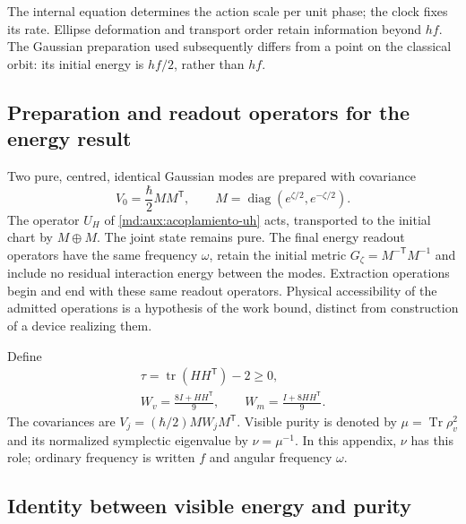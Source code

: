 The internal equation determines the action scale per unit phase;
the clock fixes its rate. Ellipse deformation and transport order
retain information beyond $hf$. The Gaussian preparation used
subsequently differs from a point on the classical orbit: its initial
energy is $hf/2$, rather than $hf$.

\subsection{Preparation and readout operators for the energy result}
\label{md:aux:hipotesis-gaussianas}

Two pure, centred, identical Gaussian modes are prepared with
covariance
\begin{equation}
 V_0=\frac\hbar2MM^{\mathsf T},\qquad
 M=\operatorname{diag}(e^{\zeta/2},e^{-\zeta/2}).
 \label{md:aux:preparacion}
\end{equation}
The operator $U_H$ of \eqref{md:aux:acoplamiento-uh} acts,
transported to the initial chart by $M\oplus M$. The joint state
remains pure. The final energy readout operators have the same
frequency $\omega$, retain the initial metric
$G_\zeta=M^{-\mathsf T}M^{-1}$ and include no residual interaction
energy between the modes. Extraction operations begin and end with
these same readout operators. Physical accessibility of the admitted
operations is a hypothesis of the work bound, distinct from
construction of a device realizing them.

Define
\begin{equation}
 \begin{gathered}
 \tau=\operatorname{tr}(HH^{\mathsf T})-2\geq0,\\
 W_v=\frac{8I+HH^{\mathsf T}}9,\qquad
 W_m=\frac{I+8HH^{\mathsf T}}9.
 \end{gathered}
 \label{md:aux:covarianzas-reducidas}
\end{equation}
The covariances are $V_j=(\hbar/2)MW_jM^{\mathsf T}$.
Visible purity is denoted by $\mu=\operatorname{Tr}\rho_v^2$
and its normalized symplectic eigenvalue by $\nu=\mu^{-1}$.
In this appendix, $\nu$ has this role; ordinary frequency is written
$f$ and angular frequency $\omega$.

\subsection{Identity between visible energy and purity}
\label{md:aux:energia-pureza}

